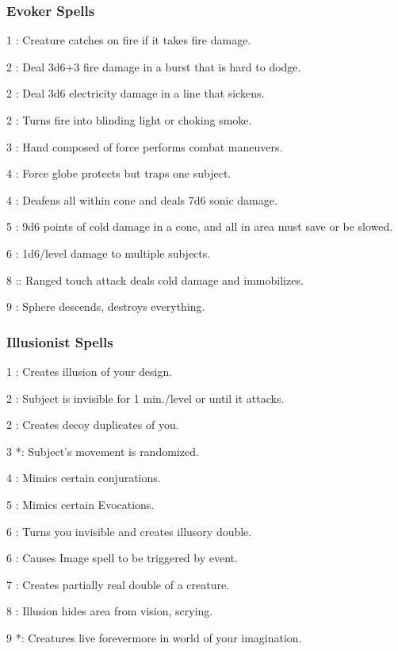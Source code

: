 \subsubsection{Evoker Spells}
\begin{list}{}{\leftmargin=1em}
\item[1] : Creature catches on fire if it takes fire damage.
\item[2] : Deal 3d6+3 fire damage in a burst that is hard to dodge.
\item[2] : Deal 3d6 electricity damage in a line that sickens.
\item[2] : Turns fire into blinding light or choking smoke.
\item[3] : Hand composed of force performs combat maneuvers.
\item[4] : Force globe protects but traps one subject.
\item[4] : Deafens all within cone and deals 7d6 sonic damage.
\item[5] : 9d6 points of cold damage in a cone, and all in area must save or be slowed.
\item[6] : 1d6/level damage to multiple subjects.
\item[8] :: Ranged touch attack deals cold damage and immobilizes.
\item[9] : Sphere descends, destroys everything.
\end{list}
\subsubsection{Illusionist Spells}
\begin{list}{}{\leftmargin=1em}
\item[1] : Creates illusion of your design.
\item[2] : Subject is invisible for 1 min./level or until it attacks.
\item[2] : Creates decoy duplicates of you.
\item[3] *: Subject's movement is randomized.
\item[4] : Mimics certain conjurations.
\item[5] : Mimics certain Evocations.
\item[6] : Turns you invisible and creates illusory double.
\item[6] : Causes Image spell to be triggered by event.
\item[7] : Creates partially real double of a creature.
\item[8] : Illusion hides area from vision, scrying.
\item[9] *: Creatures live forevermore in world of your imagination.
\end{list}
